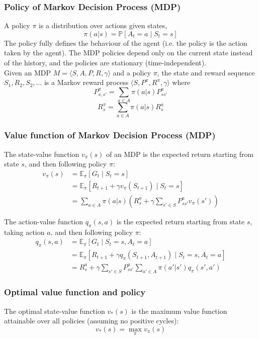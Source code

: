 \documentclass{article} %
\begin{document}
\subsubsection{Policy of Markov Decision Process (MDP)}
A policy \(\pi\) is a distribution over actions given states,
\[
\pi(a|s) = \mathbb{P}[A_t = a \mid S_t = s]
\]
The policy fully defines the behaviour of the agent (i.e. the policy is the action taken by the agent). The MDP policies depend only on the current state instead of the history, and the policies are stationary (time-independent).\\
Given an MDP \( M = \langle S, A, P, R, \gamma \rangle \) and a policy \(\pi\), the state and reward sequence \( S_1, R_2, S_2, \ldots \) is a Markov reward process \(\langle S, P^\pi, R^\pi, \gamma \rangle\)
where
\[
P_{s,s'}^\pi = \sum_{a \in A} \pi(a|s) P_{ss'}^a
\]
\[
R_s^\pi = \sum_{a \in A} \pi(a|s) R_s^a
\]


\subsubsection{Value function of Markov Decision Process (MDP)}
The state-value function \( v_\pi(s) \) of an MDP is the expected return starting from state \( s \), and then following policy \( \pi \):
\begin{align*}
v_\pi(s) &= \mathbb{E}_\pi \left[ G_t \mid S_t = s \right]\\
&= \mathbb{E}_{\pi} \left[ R_{t+1} + \gamma v_{\pi}(S_{t+1}) \mid S_t = s \right]\\
&= \sum_{a \in A} \pi(a|s) \left( R_s^a + \gamma \sum_{s' \in S} P_{ss'}^a v_{\pi}(s') \right)
\end{align*}

The action-value function \( q_\pi(s, a) \) is the expected return starting from state \( s \), taking action \( a \), and then following policy \( \pi \):
\begin{align*}
q_\pi(s, a) &= \mathbb{E}_\pi \left[ G_t \mid S_t = s, A_t = a \right]\\
&=\mathbb{E}_{\pi} \left[ R_{t+1} + \gamma q_{\pi}(S_{t+1}, A_{t+1}) \mid S_t = s, A_t = a \right]\\
&= R_s^a + \gamma \sum_{s' \in S} P_{ss'}^a \sum_{a' \in A} \pi(a'|s') q_{\pi}(s', a')
\end{align*}

\subsubsection{Optimal value function and policy}
The optimal state-value function \( v_*(s) \) is the maximum value function attainable over all policies (assuming no positive cycles):
\[
v_*(s) = \max_{\pi} v_\pi(s)
\]
\end{document}
